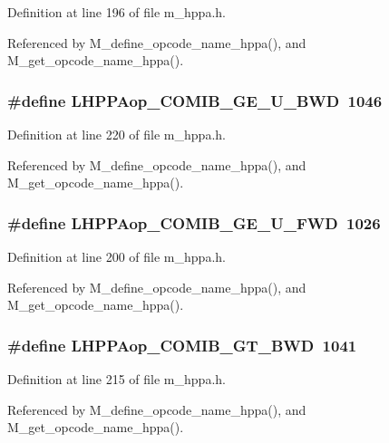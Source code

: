 Definition at line 196 of file m\_\-hppa.h.

Referenced by M\_\-define\_\-opcode\_\-name\_\-hppa(), and M\_\-get\_\-opcode\_\-name\_\-hppa().
\subsubsection{\setlength{\rightskip}{0pt plus 5cm}\#define LHPPAop\_\-COMIB\_\-GE\_\-U\_\-BWD~1046}\label{m__hppa_8h_09e099d4c304b126515af4f904682650}




Definition at line 220 of file m\_\-hppa.h.

Referenced by M\_\-define\_\-opcode\_\-name\_\-hppa(), and M\_\-get\_\-opcode\_\-name\_\-hppa().
\subsubsection{\setlength{\rightskip}{0pt plus 5cm}\#define LHPPAop\_\-COMIB\_\-GE\_\-U\_\-FWD~1026}\label{m__hppa_8h_0121becfb4089d286945f70e4ba1e482}




Definition at line 200 of file m\_\-hppa.h.

Referenced by M\_\-define\_\-opcode\_\-name\_\-hppa(), and M\_\-get\_\-opcode\_\-name\_\-hppa().
\subsubsection{\setlength{\rightskip}{0pt plus 5cm}\#define LHPPAop\_\-COMIB\_\-GT\_\-BWD~1041}\label{m__hppa_8h_e3db746606728faad6469956fe7128db}




Definition at line 215 of file m\_\-hppa.h.

Referenced by M\_\-define\_\-opcode\_\-name\_\-hppa(), and M\_\-get\_\-opcode\_\-name\_\-hppa().
